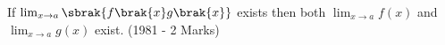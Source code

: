 \iffalse
  \title{Mains.11.A}
  \author{Shiven Bajpai}
  \section{true-false}
\fi
    

	\item{
 If $\lim_{x\to a}\sbrak{f\brak{x}g\brak{x}}$ exists then both $\lim_{x\to a}f(x)$ and $\lim_{x\to a}g(x)$ exist. \hfill (1981 - 2 Marks)
}
